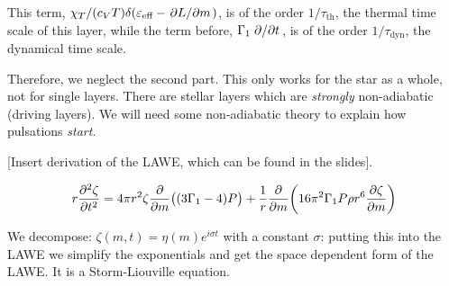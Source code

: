 \documentclass[main.tex]{subfiles}
\begin{document}
This term,  \( \chi_T / (c_V T) \delta (\varepsilon_{\text{eff}} - \pdv*{L}{m} )\), is of the order \(1/\tau_{\text{th}}\), the thermal time scale of this layer, while the term before, \(\Gamma_1 \pdv*{}{t} (\delta \rho / \rho)\), is of the order \(1/\tau_{\text{dyn}}\), the dynamical time scale.

Therefore, we neglect the second part.
This only works for the star as a whole, not for single layers.
There are stellar layers which are \emph{strongly} non-adiabatic (driving layers). We will need some non-adiabatic theory to explain how pulsations \emph{start}.

[Insert derivation of the LAWE, which can be found in the slides].

\begin{equation}
  r \pdv[2]{\zeta}{t} =
  4 \pi r^2 \zeta \pdv{}{m} \qty((3 \Gamma_1 - 4)P)+
  \frac{1}{r} \pdv{}{m} \qty(16 \pi^2 \Gamma_1 P \rho r^6 \pdv{\zeta}{m} )
\end{equation}

We decompose: \(\zeta(m, t) = \eta(m) e^{i \sigma t}\) with a constant \(\sigma\): putting this into the LAWE we simplify the exponentials and get the space dependent form of the LAWE.
It is a Storm-Liouville equation.
\end{document}
